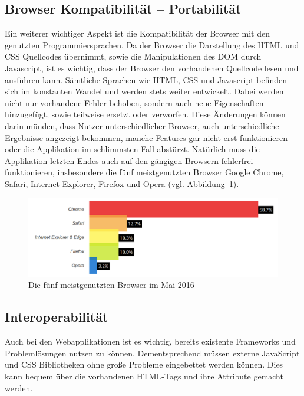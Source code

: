 \subsection{Browser Kompatibilität – Portabilität}
\label{sec:Browser Kompatibilität Portabilität}
Ein weiterer wichtiger Aspekt ist die Kompatibilität der Browser mit den genutzten Programmiersprachen. Da der Browser die Darstellung des HTML und CSS Quellcodes übernimmt, sowie die Manipulationen des DOM durch Javascript, ist es wichtig, dass der Browser den vorhandenen Quellcode lesen und ausführen kann. Sämtliche Sprachen wie HTML, CSS und Javascript befinden sich im konstanten Wandel und werden stets weiter entwickelt.
Dabei werden nicht nur vorhandene Fehler behoben, sondern auch neue Eigenschaften hinzugefügt, sowie teilweise ersetzt oder verworfen. Diese Änderungen können darin münden, dass Nutzer unterschiedlicher Browser, auch unterschiedliche Ergebnisse angezeigt bekommen, manche Features gar nicht erst funktionieren oder die Applikation im schlimmsten Fall abstürzt. Natürlich muss die Applikation letzten Endes auch auf den gängigen Browsern fehlerfrei funktionieren, insbesondere die fünf meistgenutzten Browser Google Chrome, Safari, Internet Explorer, Firefox und Opera (vgl. Abbildung~\ref{fig:browser-may-2016}).

\begin{figure}[hb]
  \centering  
  \includegraphics[scale=0.3]{img/browser_2016.png}
  \caption{Die fünf meistgenutzten Browser im Mai 2016}\label{fig:browser-may-2016}
\end{figure}

\subsection{Interoperabilität}
\label{sec:Interoperabilität_Analyse}
Auch bei den Webapplikationen ist es wichtig, bereits existente Frameworks und Problemlösungen nutzen zu können. Dementsprechend müssen externe JavaScript und CSS Bibliotheken ohne große Probleme eingebettet werden können. Dies kann bequem über die vorhandenen HTML-Tags und ihre Attribute gemacht werden.


